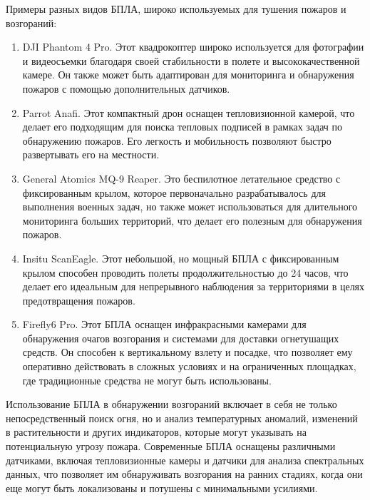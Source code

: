 Примеры разных видов БПЛА, широко используемых для тушения пожаров и возгораний:
\begin{enumerate}
	\item DJI Phantom 4 Pro. Этот квадрокоптер широко используется для фотографии и видеосъемки благодаря своей стабильности в полете и высококачественной камере. Он также может быть адаптирован для мониторинга и обнаружения пожаров с помощью дополнительных датчиков.
	\item Parrot Anafi. Этот компактный дрон оснащен тепловизионной камерой, что делает его подходящим для поиска тепловых подписей в рамках задач по обнаружению пожаров. Его легкость и мобильность позволяют быстро развертывать его на местности.
	\item General Atomics MQ-9 Reaper. Это беспилотное летательное средство с фиксированным крылом, которое первоначально разрабатывалось для выполнения военных задач, но также может использоваться для длительного мониторинга больших территорий, что делает его полезным для обнаружения пожаров.
	\item Insitu ScanEagle. Этот небольшой, но мощный БПЛА с фиксированным крылом способен проводить полеты продолжительностью до 24 часов, что делает его идеальным для непрерывного наблюдения за территориями в целях предотвращения пожаров.
	\item Firefly6 Pro. Этот БПЛА оснащен инфракрасными камерами для обнаружения очагов возгорания и системами для доставки огнетушащих средств. Он способен к вертикальному взлету и посадке, что позволяет ему оперативно действовать в сложных условиях и на ограниченных площадках, где традиционные средства не могут быть использованы.
\end{enumerate}

Использование БПЛА в обнаружении возгораний включает в себя не только непосредственный поиск огня, но и анализ температурных аномалий, изменений в растительности и других индикаторов, которые могут указывать на потенциальную угрозу пожара. Современные БПЛА оснащены различными датчиками, включая тепловизионные камеры и датчики для анализа спектральных данных, что позволяет им обнаруживать возгорания на ранних стадиях, когда они еще могут быть локализованы и потушены с минимальными усилиями.
